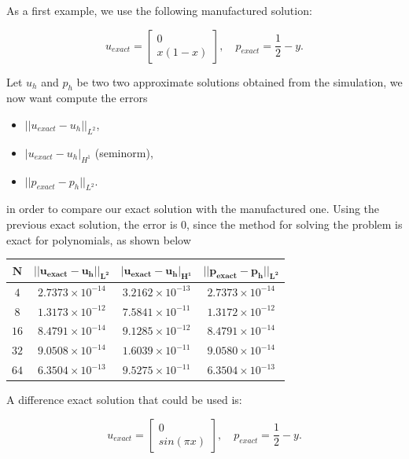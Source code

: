 \documentclass[11pt,a4paper,titlepage]{report}
\begin{document}
As a first example, we use the following manufactured solution:

\[
u_{exact} = \left[ \begin{array}{c} 0 \\ x(1-x) \end{array} \right], \quad 
p_{exact} = \frac{1}{2}-y.
\]

Let $u_h$ and $p_h$ be two two approximate solutions obtained from the simulation, we now want compute the errors

\begin{itemize}
\item $|| u_{exact} - u_h ||_{L^2}$,
\item $ | u_{exact} - u_h |_{H^1}$ (seminorm),
\item $|| p_{exact} - p_h ||_{L^2} $.
\end{itemize}

in order to compare our exact solution with the manufactured one.
Using the previous exact solution, the error is 0, since the method for solving the problem is exact for polynomials, as shown below


\begin{center}
\begin{tabular}{| c | c | c | c |}
\hline
$\mathbf{N}$ & $\mathbf{|| u_{exact} - u_h ||_{L^2}}$ & $ \mathbf{ | u_{exact} - u_h |_{H^1}}$ & $  \mathbf{ || p_{exact} - p_h ||_{L^2}}$ \\
\hline
$ 4 $ & $2.7373 \times 10^{-14}$ & $3.2162 \times 10^{-13}$ &  $ 2.7373 \times 10^{-14}$ \\
\hline
$ 8$ & $1.3173  \times 10^{-12}$ & $7.5841 \times 10^{-11}$ &  $ 1.3172  \times 10^{-12}$ \\
\hline
$ 16 $ & $ 8.4791 \times 10^{-14}$ & $9.1285 \times 10^{-12}$ & $ 8.4791 \times 10^{-14}$ \\
\hline
$ 32$ & $9.0508 \times 10^{-14}$ & $1.6039 \times 10^{-11}$ &  $ 9.0580 \times 10^{-14}$ \\
\hline
$ 64$ & $6.3504 \times 10^{-13}$ & $9.5275 \times 10^{-11}$ &  $ 6.3504 \times 10^{-13}$ \\
\hline
\end{tabular}
\end{center}

\vspace{1cm}

A difference exact solution that could be used is:

\[
u_{exact} = \left[ \begin{array}{c} 0 \\ sin(\pi x) \end{array} \right], \quad 
p_{exact} = \frac{1}{2}-y.
\]
\end{document}
